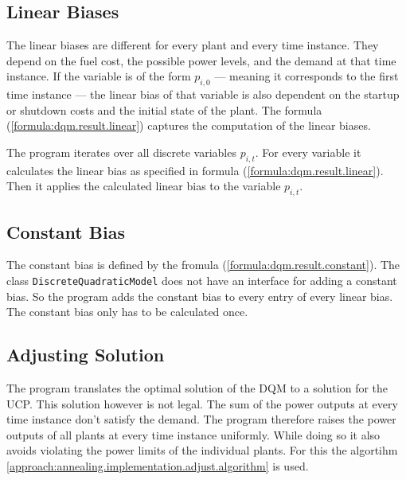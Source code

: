 \subsection*{Linear Biases}

The linear biases are different for every plant and every time instance.
They depend on the fuel cost, the possible power levels, and the demand at that time instance.
If the variable is of the form $p_{i, 0}$ --- meaning it corresponds to the first time instance --- the linear bias of that variable is also dependent on the startup or shutdown costs and the initial state of the plant.
The formula (\ref{formula:dqm.result.linear}) captures the computation of the linear biases.

The program iterates over all discrete variables $p_{i, t}$.
For every variable it calculates the linear bias as specified in formula (\ref{formula:dqm.result.linear}).
Then it applies the calculated linear bias to the variable $p_{i, t}$.

\subsection*{Constant Bias}

The constant bias is defined by the fromula (\ref{formula:dqm.result.constant}).
The class \texttt{DiscreteQuadraticModel} does not have an interface for adding a constant bias.
So the program adds the constant bias to every entry of every linear bias.
The constant bias only has to be calculated once.

\subsection{Adjusting Solution}
\label{approach:annealing.implementation.adjust}

The program translates the optimal solution of the DQM to a solution for the UCP.
This solution however is not legal.
The sum of the power outputs at every time instance don't satisfy the demand.
The program therefore raises the power outputs of all plants at every time instance uniformly.
While doing so it also avoids violating the power limits of the individual plants.
For this the algortihm \ref{approach:annealing.implementation.adjust.algorithm} is used.


